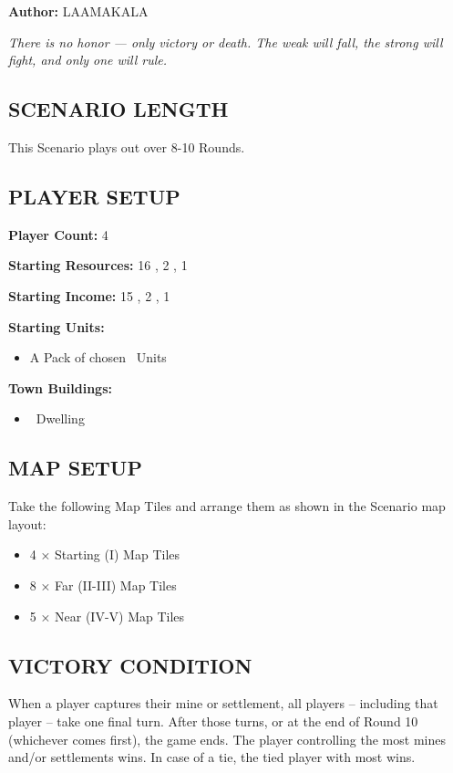 
\begin{multicols*}{2}

\textbf{Author:} LAAMAKALA

\textit{There is no honor — only victory or death. The weak will fall, the strong will fight, and only one will rule.}

\subsection*{\MakeUppercase{Scenario Length}}
This Scenario plays out over 8-10 Rounds.

\subsection*{\MakeUppercase{Player Setup}}
\textbf{Player Count:} 4

\textbf{Starting Resources:} 16 , 2 , 1 

\textbf{Starting Income:} 15 , 2 , 1 

\textbf{Starting Units:}
\begin{itemize}
  \item A Pack of chosen \bronze\ Units
\end{itemize}

\textbf{Town Buildings:}
\begin{itemize}
  \item \bronze\ Dwelling
\end{itemize}

\subsection*{\MakeUppercase{Map Setup}}
Take the following Map Tiles and arrange them as shown in the Scenario map layout:

\begin{itemize}
  \item 4 × Starting (I) Map Tiles
  \item 8 × Far (II-III) Map Tiles
  \item 5 × Near (IV-V) Map Tiles
\end{itemize}

\subsection*{\MakeUppercase{Victory Condition}}
When a player captures their  mine or settlement, all players -- including that player -- take one final turn. After those turns, or at the end of Round 10 (whichever comes first), the game ends. The player controlling the most mines and/or settlements wins. In case of a tie, the tied player with most  wins.


\end{multicols*}
